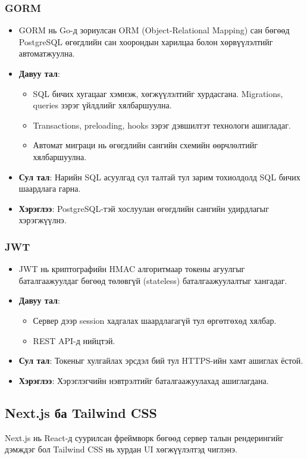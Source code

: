 \subsubsection{GORM}
\begin{itemize}
    \item GORM нь Go-д зориулсан ORM (Object-Relational Mapping) сан бөгөөд PostgreSQL өгөгдлийн сан 
    хоорондын харилцаа болон хөрвүүлэлтийг автоматжуулна.
    \item \textbf{Давуу тал}: 
    \begin{itemize}
        \item SQL бичих хугацааг хэмнэж, хөгжүүлэлтийг хурдасгана. Migrations, queries зэрэг үйлдлийг
         хялбаршуулна.
        \item Transactions, preloading, hooks зэрэг дэвшилтэт технологи ашигладаг.
        \item Автомат миграци нь өгөгдлийн сангийн схемийн өөрчлөлтийг хялбаршуулна.
    \end{itemize}
    \item \textbf{Сул тал}: Нарийн SQL асуулгад сул талтай тул зарим тохиолдолд SQL бичих шаардлага гарна.
    \item \textbf{Хэрэглээ}: PostgreSQL-тэй хослуулан өгөгдлийн сангийн удирдлагыг хэрэгжүүлнэ.
\end{itemize}

\subsubsection{JWT}
\begin{itemize}
    \item JWT нь криптографийн HMAC алгоритмаар токены агуулгыг баталгаажуулдаг бөгөөд төлөвгүй 
    (stateless) баталгаажуулалтыг хангадаг.
    \item \textbf{Давуу тал}: 
    \begin{itemize}
        \item Сервер дээр session хадгалах шаардлагагүй тул өргөтгөхөд хялбар.
        \item REST API-д нийцтэй.
    \end{itemize}
    \item \textbf{Сул тал}: Токеныг хулгайлах эрсдэл бий тул HTTPS-ийн хамт ашиглах ёстой.
    \item \textbf{Хэрэглээ}: Хэрэглэгчийн нэвтрэлтийг баталгаажуулахад ашиглагдана.
\end{itemize}

\subsection{Next.js ба Tailwind CSS}
Next.js нь React-д суурилсан фреймворк бөгөөд сервер талын рендерингийг дэмждэг бол Tailwind CSS 
нь хурдан UI хөгжүүлэлтэд чиглэнэ.

